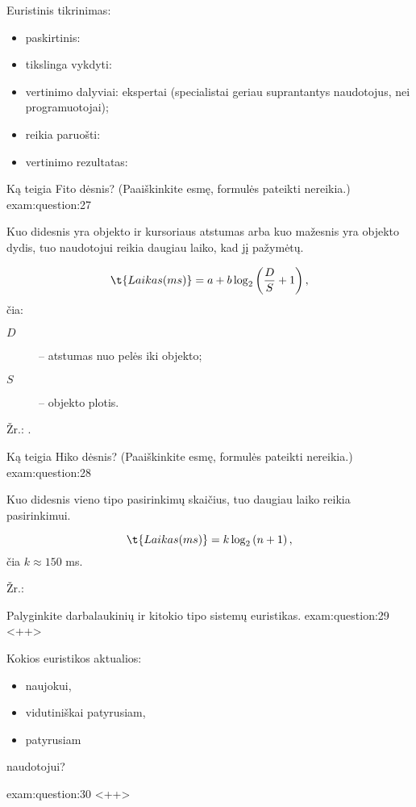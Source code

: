 \begin{question}
  Euristinis tikrinimas\cite{skaidres-11}:
  \begin{itemize}
    \item paskirtinis:
    \item tikslinga vykdyti:
    \item vertinimo dalyviai: ekspertai (specialistai geriau suprantantys
      naudotojus, nei programuotojai);
    \item reikia paruošti: 
    \item vertinimo rezultatas:
  \end{itemize}
\end{question}

\begin{question}{%
  Ką teigia Fito dėsnis? (Paaiškinkite esmę, formulės pateikti nereikia.)
  }{exam:question:27}


  Kuo didesnis yra objekto ir kursoriaus atstumas arba kuo mažesnis
  yra objekto dydis, tuo naudotojui reikia daugiau laiko, kad jį
  pažymėtų.

  \begin{equation*}
    \t{Laikas (ms)} = a + b \log_2 \left( \frac{D}{S} + 1 \right),
  \end{equation*}
  čia:
  \begin{description}
    \item[$D$] – atstumas nuo pelės iki objekto;
    \item[$S$] – objekto plotis.
  \end{description}

  Žr.: \cite[48]{skaidres-8}.
\end{question}

\begin{question}{%
  Ką teigia Hiko dėsnis? (Paaiškinkite esmę, formulės pateikti nereikia.)
  }{exam:question:28}


  Kuo didesnis vieno tipo pasirinkimų skaičius, tuo daugiau laiko
  reikia pasirinkimui.

  \begin{equation*}
    \t{Laikas (ms)} = k \log_2 \left( n + 1 \right),
  \end{equation*}
  čia $k \approx 150$ ms.

  Žr.: \cite[51]{skaidres-8}
\end{question}

\begin{question}{%
  Palyginkite darbalaukinių ir kitokio tipo sistemų euristikas.
  }{exam:question:29}
  <++>
\end{question}

\begin{question}{%
  Kokios euristikos aktualios:
  \begin{itemize}
    \item naujokui,
    \item vidutiniškai patyrusiam,
    \item patyrusiam
  \end{itemize}
  naudotojui?
  }{exam:question:30}
  <++>
\end{question}
